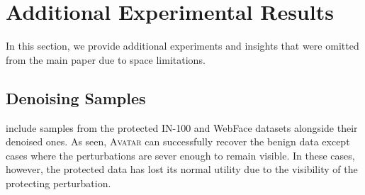 \documentclass[conference]{IEEEtran}
\theoremstyle{definition}
\theoremstyle{remark}
\theoremstyle{proposition}
\begin{document}
\newpage
\section{Additional Experimental Results}\label{sec:additional_experiments}
In this section, we provide additional experiments and insights that were omitted from the main paper due to space limitations.

\subsection{Denoising Samples}\label{sec:additional_experiments:samples}
 include samples from the protected IN-100 and WebFace datasets alongside their denoised ones. 
As seen, \textsc{Avatar} can successfully recover the benign data except cases where the perturbations are sever enough to remain visible.
In these cases, however, the protected data has lost its normal utility due to the visibility of the protecting perturbation.
\end{document}

